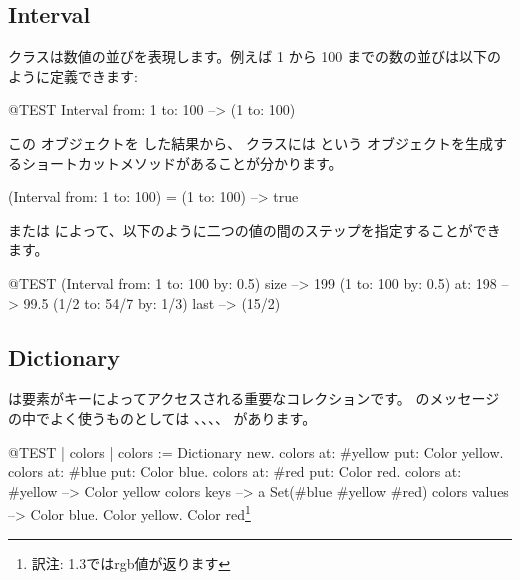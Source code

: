 \documentclass[a4paper,10pt,twoside]{book}
\begin{document}

\subsection{Interval}
 クラスは数値の並びを表現します。例えば 1 から 100 までの数の並びは以下のように定義できます:
\begin{code}{@TEST}
Interval from: 1 to: 100 --> (1 to: 100)
\end{code}

\noindent
この  オブジェクトを  した結果から、 クラスには  という  オブジェクトを生成するショートカットメソッドがあることが分かります。

\begin{code}{}
(Interval from: 1 to: 100) = (1 to: 100) --> true
\end{code}

 または  によって、以下のように二つの値の間のステップを指定することができます。

\begin{code}{@TEST}
(Interval from: 1 to: 100 by: 0.5) size --> 199
(1 to: 100 by: 0.5) at: 198 --> 99.5
(1/2 to: 54/7 by: 1/3) last --> (15/2)
\end{code}

\subsection{Dictionary}
は要素がキーによってアクセスされる重要なコレクションです。
のメッセージの中でよく使うものとしては 、、、、 があります。

\begin{code}{@TEST | colors |}
colors := Dictionary new.
colors at: #yellow put: Color yellow.
colors at: #blue put: Color blue.
colors at: #red put: Color red.
colors at: #yellow --> Color yellow
colors keys          --> a Set(#blue #yellow #red)
colors values       --> {Color blue. Color yellow. Color red}\footnote{訳注: \pharo 1.3ではrgb値が返ります}
\end{code}
\end{document}
